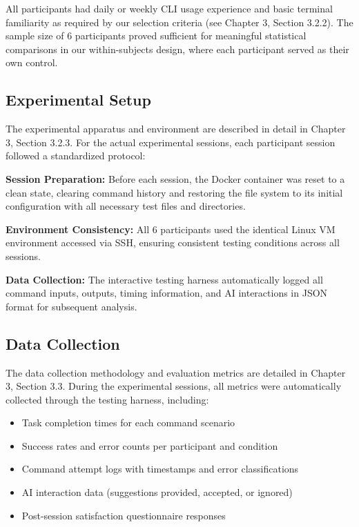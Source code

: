 All participants had daily or weekly CLI usage experience and basic terminal familiarity as required by our selection criteria (see Chapter 3, Section 3.2.2). The sample size of 6 participants proved sufficient for meaningful statistical comparisons in our within-subjects design, where each participant served as their own control.

\subsection{Experimental Setup}

The experimental apparatus and environment are described in detail in Chapter 3, Section 3.2.3. For the actual experimental sessions, each participant session followed a standardized protocol:

\textbf{Session Preparation:} Before each session, the Docker container was reset to a clean state, clearing command history and restoring the file system to its initial configuration with all necessary test files and directories.

\textbf{Environment Consistency:} All 6 participants used the identical Linux VM environment accessed via SSH, ensuring consistent testing conditions across all sessions.

\textbf{Data Collection:} The interactive testing harness automatically logged all command inputs, outputs, timing information, and AI interactions in JSON format for subsequent analysis.

\subsection{Data Collection}

The data collection methodology and evaluation metrics are detailed in Chapter 3, Section 3.3. During the experimental sessions, all metrics were automatically collected through the testing harness, including:

\begin{itemize}
	\item Task completion times for each command scenario
	\item Success rates and error counts per participant and condition
	\item Command attempt logs with timestamps and error classifications
	\item AI interaction data (suggestions provided, accepted, or ignored)
	\item Post-session satisfaction questionnaire responses
\end{itemize}

